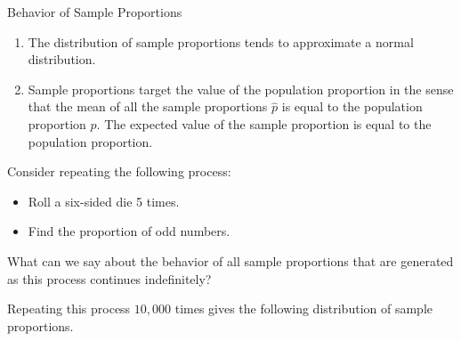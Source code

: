 \documentclass{beamer}
\begin{document}
\begin{frame}
\begin{block}{Behavior of Sample Proportions}
\begin{enumerate}
\item<1-> The distribution of sample proportions tends to approximate a normal distribution.
\item<2-> Sample proportions target the value of the population proportion in the sense that the mean of all the sample proportions $\hat{p}$ is equal to the population proportion $p$. The expected value of the sample proportion is equal to the population proportion.
\end{enumerate}
\end{block}
\end{frame}

\begin{frame}
\begin{example}
Consider repeating the following process:
\begin{itemize}
\item Roll a six-sided die 5 times.
\item Find the proportion of odd numbers.
\end{itemize}
What can we say about the behavior of all sample proportions that are generated as this process continues indefinitely?

\vspace{2mm}
Repeating this process $10,000$ times gives the following distribution of sample proportions.

\vspace{-5mm}
\begin{center}
\end{center}
\vspace{-6mm}
\end{example}
\end{frame}
\end{document}
